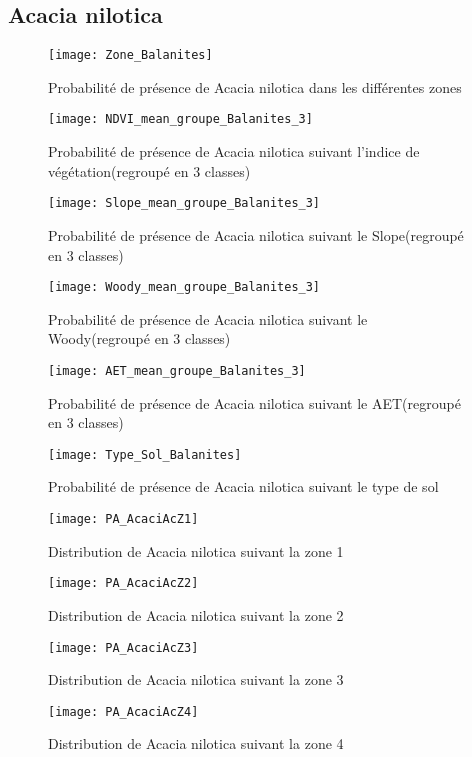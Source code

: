 \documentclass[a4paper, oneside, 12pt]{book}
\begin{document}
\subsection{Acacia nilotica}
\begin{figure}[H]
	\centering
	\caption{Probabilité de présence de Acacia nilotica dans les différentes zones}
	\texttt{[image: Zone\_Balanites]}	
\end{figure}


\begin{figure}[H]
	\centering
	\caption{Probabilité de présence de Acacia nilotica suivant l'indice de végétation(regroupé en 3 classes)}
	\texttt{[image: NDVI\_mean\_groupe\_Balanites\_3]}
\end{figure}


\begin{figure}[H]
	\centering
	\caption{Probabilité de présence de Acacia nilotica suivant le Slope(regroupé en 3 classes)}
	\texttt{[image: Slope\_mean\_groupe\_Balanites\_3]}
\end{figure}


\begin{figure}[H]
	\centering
	\caption{Probabilité de présence de Acacia nilotica suivant le Woody(regroupé en 3 classes)}
	\texttt{[image: Woody\_mean\_groupe\_Balanites\_3]}
\end{figure}


\begin{figure}[H]
	\centering
	\caption{Probabilité de présence de Acacia nilotica suivant le AET(regroupé en 3 classes)}
	\texttt{[image: AET\_mean\_groupe\_Balanites\_3]}
\end{figure}
\begin{figure}[H]
	\centering
	\caption{Probabilité de présence de Acacia nilotica suivant le type de sol}
	\texttt{[image: Type\_Sol\_Balanites]}
\end{figure}
\begin{figure}[H]
	\centering
	\caption{Distribution de Acacia nilotica suivant la zone 1}
	\texttt{[image: PA\_AcaciAcZ1]}	
\end{figure}
\begin{figure}[H]
	\centering
	\caption{Distribution de Acacia nilotica suivant la zone 2}
	\texttt{[image: PA\_AcaciAcZ2]}	
\end{figure}
\begin{figure}[H]
	\centering
	\caption{Distribution de Acacia nilotica suivant la zone 3}
	\texttt{[image: PA\_AcaciAcZ3]}	
\end{figure}
\begin{figure}[H]
	\centering
	\caption{Distribution de Acacia nilotica suivant la zone 4}
	\texttt{[image: PA\_AcaciAcZ4]}	
\end{figure}
\end{document}
